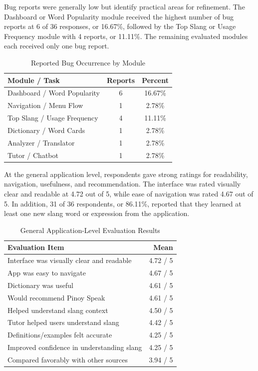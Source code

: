 Bug reports were generally low but identify practical areas for refinement. The Dashboard or Word Popularity module received the highest number of bug reports at 6 of 36 responses, or 16.67\%, followed by the Top Slang or Usage Frequency module with 4 reports, or 11.11\%. The remaining evaluated modules each received only one bug report.

\begin{table}[H]
\centering
\caption{Reported Bug Occurrence by Module}
\label{tab:bug_reports}
\small
\begin{tabular}{p{}cc}
\toprule
\textbf{Module / Task} & \textbf{Reports} & \textbf{Percent} \\
\midrule
Dashboard / Word Popularity & 6 & 16.67\% \\
Navigation / Menu Flow & 1 & 2.78\% \\
Top Slang / Usage Frequency & 4 & 11.11\% \\
Dictionary / Word Cards & 1 & 2.78\% \\
Analyzer / Translator & 1 & 2.78\% \\
Tutor / Chatbot & 1 & 2.78\% \\
\bottomrule
\end{tabular}
\end{table}

At the general application level, respondents gave strong ratings for readability, navigation, usefulness, and recommendation. The interface was rated visually clear and readable at 4.72 out of 5, while ease of navigation was rated 4.67 out of 5. In addition, 31 of 36 respondents, or 86.11\%, reported that they learned at least one new slang word or expression from the application.

\begin{table}[H]
\centering
\caption{General Application-Level Evaluation Results}
\label{tab:general_eval}
\begin{tabular}{p{}r}
\toprule
\textbf{Evaluation Item} & \textbf{Mean} \\
\midrule
Interface was visually clear and readable & 4.72 / 5 \\
App was easy to navigate & 4.67 / 5 \\
Dictionary was useful & 4.61 / 5 \\
Would recommend Pinoy Speak & 4.61 / 5 \\
Helped understand slang context & 4.50 / 5 \\
Tutor helped users understand slang & 4.42 / 5 \\
Definitions/examples felt accurate & 4.25 / 5 \\
Improved confidence in understanding slang & 4.25 / 5 \\
Compared favorably with other sources & 3.94 / 5 \\
\bottomrule
\end{tabular}
\end{table}


